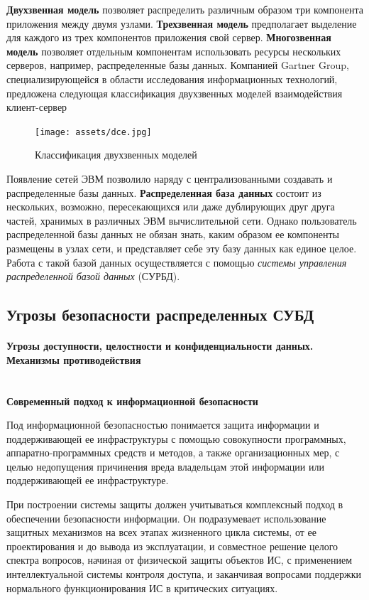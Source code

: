 \textbf{Двухзвенная модель} позволяет распределить различным образом три компонента приложения между двумя узлами.
\textbf{Трехзвенная модель} предполагает выделение для каждого из трех компонентов приложения свой сервер.
\textbf{Многозвенная модель} позволяет отдельным компонентам использовать ресурсы нескольких серверов, например,
распределенные базы данных. Компанией Gartner Group, специализирующейся в области исследования информационных технологий,
предложена следующая классификация двухзвенных моделей взаимодействия клиент-сервер \autocite{dce}
\begin{figure}[h!]
    \centering
    \texttt{[image: assets/dce.jpg]}
    \caption{Классификация двухзвенных моделей}
\end{figure}

Появление сетей ЭВМ позволило наряду с централизованными создавать и распределенные базы данных.
\textbf{Распределенная база данных} состоит из нескольких, возможно, пересекающихся или даже дублирующих друг друга
частей, хранимых в различных ЭВМ вычислительной сети. Однако пользователь распределенной базы данных не обязан
знать, каким образом ее компоненты размещены в узлах сети, и представляет себе эту базу данных как единое
целое. Работа с такой базой данных осуществляется с помощью \textit{системы управления распределенной базой данных} (СУРБД).
\\

\subsection{Угрозы безопасности распределенных СУБД}
\paragraph{Угрозы доступности, целостности и конфиденциальности данных. Механизмы противодействия} ~\\

\textbf{Современный подход к информационной безопасности}

Под информационной безопасностью понимается защита информации и поддерживающей ее инфраструктуры с помощью
совокупности программных, аппаратно-программных средств и методов, а также организационных мер, с целью недопущения
причинения вреда владельцам этой информации или поддерживающей ее инфраструктуре.

При построении системы защиты должен учитываться комплексный подход в обеспечении безопасности информации.
Он подразумевает использование защитных механизмов на всех этапах жизненного цикла системы, от ее проектирования
и до вывода из эксплуатации, и совместное решение целого спектра вопросов, начиная от физической защиты объектов ИС,
с применением интеллектуальной системы контроля доступа, и заканчивая вопросами поддержки нормального функционирования
ИС в критических ситуациях.

